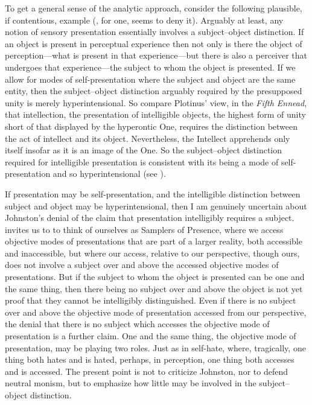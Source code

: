 To get a general sense of the analytic approach, consider the following plausible, if contentious, example (\citealt{Johnston:2007qy}, for one, seems to deny it). Arguably at least, any notion of sensory presentation essentially involves a subject--object distinction. If an object is present in perceptual experience then not only is there the object of perception---what is present in that experience---but there is also a perceiver that undergoes that experience---the subject to whom the object is presented. If we allow for modes of self-presentation where the subject and object are the same entity, then the subject--object distinction arguably required by the presupposed unity is merely hyperintensional. So compare Plotinus' view, in the \emph{Fifth Ennead}, that intellection, the presentation of intelligible objects, the highest form of unity short of that displayed by the hyperontic One, requires the distinction between the act of intellect and its object. Nevertheless, the Intellect apprehends only itself insofar as it is an image of the One. So the subject--object distinction required for intelligible presentation is consistent with its being a mode of self-presentation and so hyperintensional (see \citealt[chapter 3.1]{Gerson:1994aa}). 

If presentation may be self-presentation, and the intelligible distinction between subject and object may be hyperintensional, then I am genuinely uncertain about Johnston's denial of the claim that presentation intelligibly requires a subject. \citet{Johnston:2007qy} invites us to to think of ourselves as Samplers of Presence, where we access objective modes of presentations that are part of a larger reality, both accessible and inaccessible, but where our access, relative to our perspective, though ours, does not involve a subject over and above the accessed objective modes of presentations. But if the subject to whom the object is presented can be one and the same thing, then there being no subject over and above the object is not yet proof that they cannot be intelligibly distinguished. Even if there is no subject over and above the objective mode of presentation accessed from our perspective, the denial that there is no subject which accesses the objective mode of presentation is a further claim. One and the same thing, the objective mode of presentation, may be playing two roles. Just as in self-hate, where, tragically, one thing both hates and is hated, perhaps, in perception, one thing both accesses and is accessed. The present point is not to criticize Johnston, nor to defend neutral monism, but to emphasize how little may be involved in the subject--object distinction.

